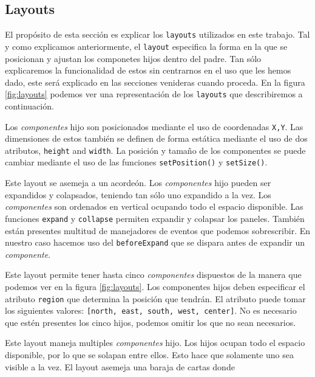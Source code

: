 	\subsection{Layouts}
		El propósito de esta sección es explicar los \texttt{layouts} utilizados en este trabajo. Tal y como explicamos anteriormente, el
		\texttt{layout} especifica la forma en la que se posicionan y ajustan los componetes hijos dentro del padre. Tan sólo explicaremos la
		funcionalidad de estos sin centrarnos en el uso que les hemos dado, este será explicado en las secciones venideras cuando proceda. En
		la figura \ref{fig:layouts} podemos ver una representación de los \texttt{layouts} que describiremos a continuación.
		\begin{description}[style=unboxed,leftmargin=0cm,labelwidth=1cm]
			\item[\texttt{Absolute}] Los \emph{componentes} hijo son posicionados mediante el uso de coordenadas \texttt{X,Y}. Las
			  dimensiones de estos también se definen de forma estática mediante el uso de dos atributos, \texttt{height} and
			  \texttt{width}. La posición y tamaño de los componentes se puede cambiar mediante el uso de las funciones
			  \texttt{setPosition()} y \texttt{setSize()}.
			\item[\texttt{Accordion}] Este layout se asemeja a un acordeón. Los \emph{componentes} hijo pueden ser expandidos y
			  colapsados, teniendo tan sólo uno expandido a la vez. Los \emph{componentes} son ordenados en vertical ocupando todo el
			  espacio disponible. Las funciones \texttt{expand} y \texttt{collapse} permiten expandir y colapsar los paneles.
			  También están presentes multitud de manejadores de eventos que podemos sobrescribir. En nuestro caso hacemos uso del
			  \texttt{beforeExpand} que se dispara antes de expandir un \emph{componente}. 
			\item[\texttt{Border}] Este layout permite tener hasta cinco \emph{componentes} dispuestos de la manera que podemos ver en la
			  figura \ref{fig:layouts}. Los componentes hijos deben especificar el atributo \texttt{region} que determina la posición que
			  tendrán. El atributo puede tomar los siguientes valores: \texttt{[north, east, south, west, center]}. No es necesario que
			  estén presentes los cinco hijos, podemos omitir los que no sean necesarios.
			\item[\texttt{Card}] Este layout maneja multiples \emph{componentes} hijo. Los hijos ocupan todo el espacio disponible, por lo
			  que se solapan entre ellos. Esto hace que solamente uno sea visible a la vez. El layout asemeja una baraja de cartas donde

\end{description}
